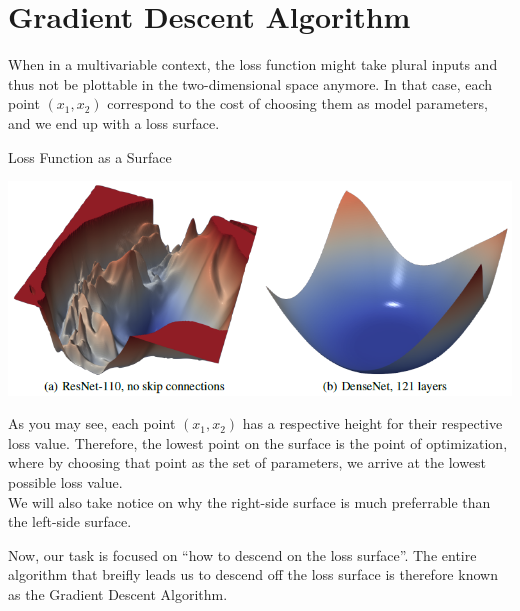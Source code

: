 \section{Gradient Descent Algorithm}
When in a multivariable context, the loss function might take plural inputs and thus not be plottable in the two-dimensional space anymore. In that case, each point $(x_1, x_2)$ correspond to the cost of choosing them as model parameters, and we end up with a loss surface.
\begin{ln-fig}{Loss Function as a Surface}{}
    \begin{center}
        \includegraphics[scale=0.4]{figs/ln04/loss-surface.png}
    \end{center}
    As you may see, each point $(x_1, x_2)$ has a respective height for their respective loss value. Therefore, the lowest point on the surface is the point of optimization, where by choosing that point as the set of parameters, we arrive at the lowest possible loss value. \\
    We will also take notice on why the right-side surface is much preferrable than the left-side surface.
\end{ln-fig}
Now, our task is focused on ``how to descend on the loss surface''. The entire algorithm that breifly leads us to descend off the loss surface is therefore known as the Gradient Descent Algorithm.

